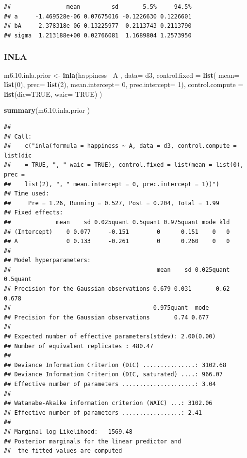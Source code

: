 \documentclass[
]{article}
\newenvironment{Shaded}{\begin{snugshade}}{\end{snugshade}}
\newcommand{\DataTypeTok}[1]{\textcolor[rgb]{0.13,0.29,0.53}{#1}}
\newcommand{\DecValTok}[1]{\textcolor[rgb]{0.00,0.00,0.81}{#1}}
\newcommand{\FloatTok}[1]{\textcolor[rgb]{0.00,0.00,0.81}{#1}}
\newcommand{\KeywordTok}[1]{\textcolor[rgb]{0.13,0.29,0.53}{\textbf{#1}}}
\newcommand{\NormalTok}[1]{#1}
\newcommand{\OperatorTok}[1]{\textcolor[rgb]{0.81,0.36,0.00}{\textbf{#1}}}
\newcommand{\OtherTok}[1]{\textcolor[rgb]{0.56,0.35,0.01}{#1}}
\newcommand{\StringTok}[1]{\textcolor[rgb]{0.31,0.60,0.02}{#1}}
\begin{document}
\begin{verbatim}
##                mean         sd       5.5%     94.5%
## a     -1.469528e-06 0.07675016 -0.1226630 0.1226601
## bA     2.378318e-06 0.13225977 -0.2113743 0.2113790
## sigma  1.213188e+00 0.02766081  1.1689804 1.2573950
\end{verbatim}

\hypertarget{inla-1}{%
\subsubsection{INLA}\label{inla-1}}

\begin{Shaded}
\begin{Highlighting}[]
\NormalTok{m6.}\FloatTok{10.}\NormalTok{inla.prior <-}\StringTok{ }\KeywordTok{inla}\NormalTok{(happiness}\OperatorTok{~}\StringTok{ }\NormalTok{A , }\DataTypeTok{data=}\NormalTok{ d3, }
                        \DataTypeTok{control.fixed =} \KeywordTok{list}\NormalTok{(}
        \DataTypeTok{mean=} \KeywordTok{list}\NormalTok{(}\DecValTok{0}\NormalTok{), }
        \DataTypeTok{prec=} \KeywordTok{list}\NormalTok{(}\DecValTok{2}\NormalTok{),}
        \DataTypeTok{mean.intercept=} \DecValTok{0}\NormalTok{, }
        \DataTypeTok{prec.intercept=} \DecValTok{1}\NormalTok{),}
        \DataTypeTok{control.compute =} \KeywordTok{list}\NormalTok{(}\DataTypeTok{dic=}\OtherTok{TRUE}\NormalTok{, }\DataTypeTok{waic=} \OtherTok{TRUE}\NormalTok{)}
\NormalTok{)}

\KeywordTok{summary}\NormalTok{(m6.}\FloatTok{10.}\NormalTok{inla.prior )}
\end{Highlighting}
\end{Shaded}

\begin{verbatim}
## 
## Call:
##    c("inla(formula = happiness ~ A, data = d3, control.compute = list(dic 
##    = TRUE, ", " waic = TRUE), control.fixed = list(mean = list(0), prec = 
##    list(2), ", " mean.intercept = 0, prec.intercept = 1))") 
## Time used:
##     Pre = 1.26, Running = 0.527, Post = 0.204, Total = 1.99 
## Fixed effects:
##             mean    sd 0.025quant 0.5quant 0.975quant mode kld
## (Intercept)    0 0.077     -0.151        0      0.151    0   0
## A              0 0.133     -0.261        0      0.260    0   0
## 
## Model hyperparameters:
##                                          mean    sd 0.025quant 0.5quant
## Precision for the Gaussian observations 0.679 0.031       0.62    0.678
##                                         0.975quant  mode
## Precision for the Gaussian observations       0.74 0.677
## 
## Expected number of effective parameters(stdev): 2.00(0.00)
## Number of equivalent replicates : 480.47 
## 
## Deviance Information Criterion (DIC) ...............: 3102.68
## Deviance Information Criterion (DIC, saturated) ....: 966.07
## Effective number of parameters .....................: 3.04
## 
## Watanabe-Akaike information criterion (WAIC) ...: 3102.06
## Effective number of parameters .................: 2.41
## 
## Marginal log-Likelihood:  -1569.48 
## Posterior marginals for the linear predictor and
##  the fitted values are computed
\end{verbatim}
\end{document}
